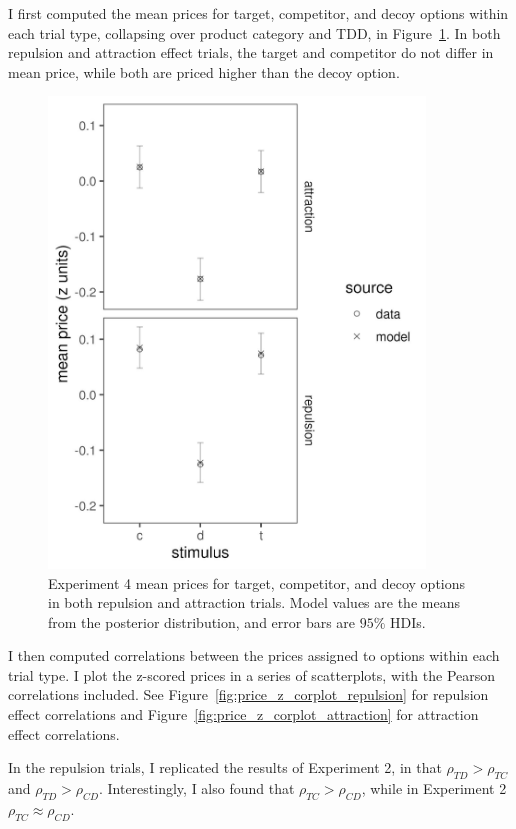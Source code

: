 I first computed the mean prices for target, competitor, and decoy options within each trial type, collapsing over product category and TDD, in Figure~\ref{fig:price_mu_model_data}. In both repulsion and attraction effect trials, the target and competitor do not differ in mean price, while both are priced higher than the decoy option.

\begin{figure}
    \includegraphics[scale=0.5, width=100mm]{figures/pricing_mu_model_data.jpeg}
    \caption{Experiment 4 mean prices for target, competitor, and decoy options in both repulsion and attraction trials. Model values are the means from the posterior distribution, and error bars are $95\%$ HDIs.}
    \label{fig:price_mu_model_data}
\end{figure}

I then computed correlations between the prices assigned to options within each trial type. I plot the z-scored prices in a series of scatterplots, with the Pearson correlations included. See Figure~\ref{fig:price_z_corplot_repulsion} for repulsion effect correlations and Figure~\ref{fig:price_z_corplot_attraction} for attraction effect correlations. 

In the repulsion trials, I replicated the results of Experiment 2, in that $\rho_{TD}>\rho_{TC}$ and $\rho_{TD}>\rho_{CD}$. Interestingly, I also found that $\rho_{TC}>\rho_{CD}$, while in Experiment 2 $\rho_{TC}\approx\rho_{CD}$.

